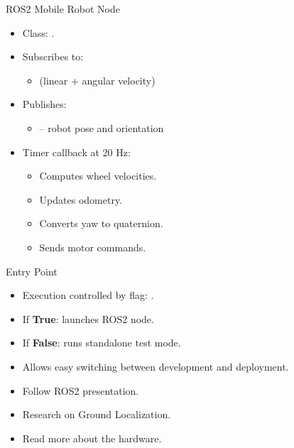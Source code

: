 \begin{frame}{ROS2 Mobile Robot Node}
	\begin{itemize}
		\item Class: .
		\item Subscribes to:
		\begin{itemize}
			\item {} (linear + angular velocity)
		\end{itemize}
		\item Publishes:
		\begin{itemize}
			\item {} – robot pose and orientation
		\end{itemize}
		\item Timer callback at 20 Hz:
		\begin{itemize}
			\item Computes wheel velocities.
			\item Updates odometry.
			\item Converts yaw to quaternion.
			\item Sends motor commands.
		\end{itemize}
	\end{itemize}
\end{frame}

\begin{frame}{Entry Point}
	\begin{itemize}
		\item Execution controlled by flag: .
		\item If \textbf{True}: launches ROS2 node.
		\item If \textbf{False}: runs standalone test mode.
		\item Allows easy switching between development and deployment.
	\end{itemize}
\end{frame}
{
	\begin{itemize}
		\item Follow ROS2 presentation.
		\item Research on Ground Localization. 
		\item Read more about the hardware.
	\end{itemize}
}

